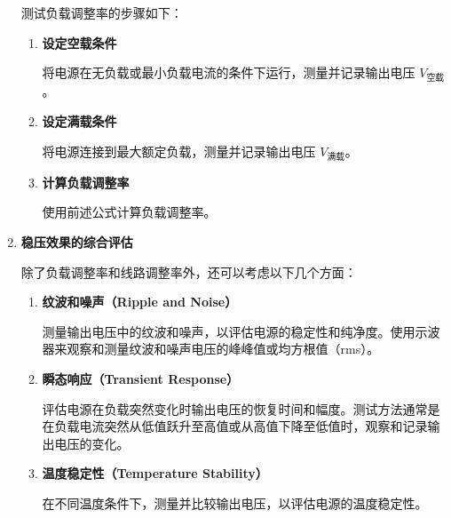 \documentclass[dvipsnames, svgnames,a4paper,11pt]{article}
\begin{document}
\begin{enumerate}
			测试负载调整率的步骤如下：
		
			\begin{enumerate}
				\item \textbf{设定空载条件}
		
				将电源在无负载或最小负载电流的条件下运行，测量并记录输出电压 \(V_{\text{空载}}\)。
		
				\item \textbf{设定满载条件}
		
				将电源连接到最大额定负载，测量并记录输出电压 \(V_{\text{满载}}\)。
		
				\item \textbf{计算负载调整率}
		
				使用前述公式计算负载调整率。
		
				
			\end{enumerate}
		
			\item \textbf{稳压效果的综合评估}
		
			除了负载调整率和线路调整率外，还可以考虑以下几个方面：
		
			\begin{enumerate}
				\item \textbf{纹波和噪声（Ripple and Noise）}
		
				测量输出电压中的纹波和噪声，以评估电源的稳定性和纯净度。使用示波器来观察和测量纹波和噪声电压的峰峰值或均方根值（rms）。
		
				\item \textbf{瞬态响应（Transient Response）}
		
				评估电源在负载突然变化时输出电压的恢复时间和幅度。测试方法通常是在负载电流突然从低值跃升至高值或从高值下降至低值时，观察和记录输出电压的变化。
		
				\item \textbf{温度稳定性（Temperature Stability）}
		
				在不同温度条件下，测量并比较输出电压，以评估电源的温度稳定性。
			\end{enumerate}
		
			
		\end{enumerate}
	
	
	
	
	
	
	
\end{document}

